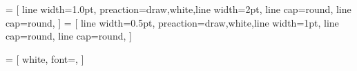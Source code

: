 \usepackage{tikz}
\usepackage{svg}

\usetikzlibrary{shapes.geometric}
\usetikzlibrary{arrows.meta}
\usetikzlibrary{positioning}
\usetikzlibrary{calc}
\usetikzlibrary{backgrounds}
\usetikzlibrary{fit}
\usetikzlibrary{fadings}
\usetikzlibrary{decorations}

\usepackage{rotating}


 = [
    line width=1.0pt,
    preaction={draw,white,line width=2pt, line cap=round},
    line cap=round,
    ]
 = [
    line width=0.5pt,
    preaction={draw,white,line width=1pt, line cap=round},
    line cap=round,
    ]

 = [
    white,
    font=\sffamily\small,
    ]


